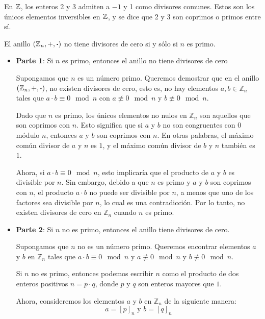 En $\mathbb{Z}$, los enteros 2 y 3 admiten a $-1$ y 1 como divisores comunes. Estos son los únicos elementos inversibles en $\mathbb{Z}$, y se dice que 2 y 3 son coprimos o primos entre sí.

\begin{fmd-theorem} \label{teo:primo}
	El anillo $(\mathbb{Z}_n, +, \boldsymbol{\cdot})$ no tiene divisores de cero si y sólo si $n$ es primo.
\end{fmd-theorem}
\begin{fmd-proof}
	
	\begin{itemize}
		\item \textbf{Parte 1}: Si $n$ es primo, entonces el anillo no tiene divisores de cero
		
		Supongamos que $n$ es un número primo. Queremos demostrar que en el anillo $(\mathbb{Z}_n, +, \boldsymbol{\cdot})$, no existen divisores de cero, esto es, no hay elementos $a, b \in \mathbb{Z}_n$ tales que $a \cdot b \equiv 0 \mod n$ con $a \not\equiv 0 \mod n$ y $b \not\equiv 0 \mod n$.
		
		Dado que $n$ es primo, los únicos elementos no nulos en $\mathbb{Z}_n$ son aquellos que son coprimos con $n$. Esto significa que si $a$ y $b$ no son congruentes con $0$ módulo $n$, entonces $a$ y $b$ son coprimos con $n$. En otras palabras, el máximo común divisor de $a$ y $n$ es $1$, y el máximo común divisor de $b$ y $n$ también es $1$.
		
		Ahora, si $a \cdot b \equiv 0 \mod n$, esto implicaría que el producto de $a$ y $b$ es divisible por $n$. Sin embargo, debido a que $n$ es primo y $a$ y $b$ son coprimos con $n$, el producto $a \cdot b$ no puede ser divisible por $n$, a menos que uno de los factores sea divisible por $n$, lo cual es una contradicción. Por lo tanto, no existen divisores de cero en $\mathbb{Z}_n$ cuando $n$ es primo.
		
		\item \textbf{Parte 2}: Si $n$ no es primo, entonces el anillo tiene divisores de cero.
		
		Supongamos que $n$ no es un número primo. Queremos encontrar elementos $a$ y $b$ en $\mathbb{Z}_n$ tales que $a \cdot b \equiv 0 \mod n$ y $a \not\equiv 0 \mod n$ y $b \not\equiv 0 \mod n$.
		
		Si $n$ no es primo, entonces podemos escribir $n$ como el producto de dos enteros positivos $n = p \cdot q$, donde $p$ y $q$ son enteros mayores que $1$.
		
		Ahora, consideremos los elementos $a$ y $b$ en $\mathbb{Z}_n$ de la siguiente manera:
		\[a = [p]_n \mbox{ y } b = [q]_n\]
		

\end{itemize}
\end{fmd-proof}

